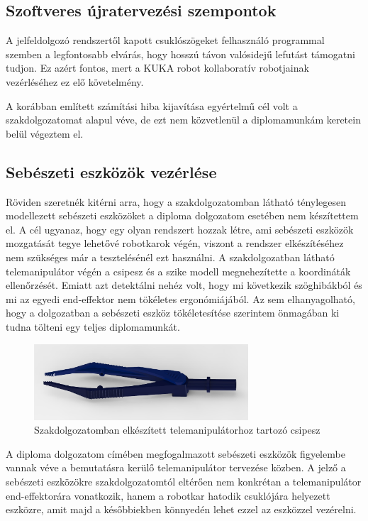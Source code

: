 \subsection{Szoftveres újratervezési szempontok}

A jelfeldolgozó rendszertől kapott csuklószögeket felhasználó programmal szemben a legfontosabb elvárás, hogy hosszú távon valósidejű lefutást támogatni tudjon. Ez azért fontos, mert a KUKA robot kollaboratív robotjainak vezérléséhez ez elő követelmény.

A korábban említett számítási hiba kijavítása egyértelmű cél volt a szakdolgozatomat alapul véve, de ezt nem közvetlenül a diplomamunkám keretein belül végeztem el.

\subsection{Sebészeti eszközök vezérlése}

Röviden szeretnék kitérni arra, hogy a szakdolgozatomban látható ténylegesen modellezett sebészeti eszközöket a diploma dolgozatom esetében nem készítettem el. A cél ugyanaz, hogy egy olyan rendszert hozzak létre, ami sebészeti eszközök mozgatását tegye lehetővé robotkarok végén, viszont a rendszer elkészítéséhez nem szükséges már a tesztelésénél ezt használni. A szakdolgozatban látható telemanipulátor végén a csipesz és a szike modell megnehezítette a koordináták ellenőrzését. Emiatt azt detektálni nehéz volt, hogy mi következik szöghibákból és mi az egyedi end-effektor nem tökéletes ergonómiájából. Az sem elhanyagolható, hogy a dolgozatban a sebészeti eszköz tökéletesítése szerintem önmagában ki tudna tölteni egy teljes diplomamunkát.

\begin{figure}[!ht]
\centering
\includegraphics[width=80mm, keepaspectratio]{figures/Szakdoga/csipesz}
\caption{Szakdolgozatomban elkészített telemanipulátorhoz tartozó csipesz}
\label{fig:Szakdoga_csipeszes}
\end{figure}

A diploma dolgozatom címében megfogalmazott sebészeti eszközök figyelembe vannak véve a bemutatásra kerülő telemanipulátor tervezése közben. A jelző a sebészeti eszközökre szakdolgozatomtól eltérően nem konkrétan a telemanipulátor end-effektorára vonatkozik, hanem a robotkar hatodik csuklójára helyezett eszközre, amit majd a későbbiekben könnyedén lehet ezzel az eszközzel vezérelni.